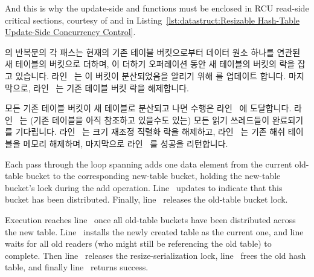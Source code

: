 {\begin{fcvref}
	And this is why the update-side  and
	 functions must be enclosed
	in RCU read-side critical sections, courtesy of
	 and  in
	Listing~\ref{lst:datastruct:Resizable Hash-Table Update-Side Concurrency Control}.
	\end{fcvref}

	\fi

}\QuickQuizEnd

\begin{fcvref}
 의 반복문의 각 패스는 현재의 기존 테이블
버킷으로부터 데이터 원소 하나를 연관된 새 테이블의 버킷으로 더하며, 이 더하기
오퍼레이션 동안 새 테이블의 버킷의 락을 잡고 있습니다.
라인~ 는 이 버킷이 분산되었음을 알리기 위해
 를 업데이트 합니다.
마지막으로, 라인~ 는 기존 테이블 버킷 락을 해제합니다.

모든 기존 테이블 버킷이 새 테이블로 분산되고 나면 수행은
라인~ 에 도달합니다.
라인~ 는 (기존 테이블을 아직 참조하고 있을수도 있는) 모든
읽기 쓰레드들이 완료되기를 기다립니다.
라인~ 는 크기 재조정 직렬화 락을 해제하고, 라인~
는 기존 해쉬 테이블을 메모리 해제하며, 마지막으로 라인~ 를
성공을 리턴합니다.
\end{fcvref}

\iffalse

\begin{fcvref}
Each pass through the loop spanning
 adds one data element
from the current old-table bucket to the corresponding new-table bucket,
holding the new-table bucket's lock during the add operation.
Line~ updates
 to indicate that this bucket has been distributed.
Finally, line~ releases the old-table bucket lock.

Execution reaches line~ once all old-table buckets have been distributed
across the new table.
Line~ installs the newly created table as the current one, and
line~ waits for all old readers (who might still be referencing
the old table) to complete.
Then line~ releases the resize-serialization lock,
line~ frees
the old hash table, and finally line~ returns success.
\end{fcvref}

